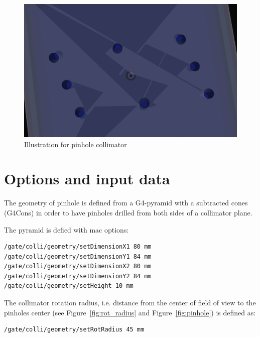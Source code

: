 \documentclass[12pt]{article}
\begin{document}
\begin{figure}[htp]
\centering
\includegraphics[scale=0.3]{figs/colli.png}
\caption{Illustration for pinhole collimator}
\label{fig:colli}
\end{figure}


\section{Options and input data}
The geometry of pinhole is defined from a G4-pyramid with a subtracted cones (G4Cons) in order to have pinholes drilled from both sides of a collimator plane.

The pyramid is defied with mac options:  
\begin{verbatim}
/gate/colli/geometry/setDimensionX1 80 mm
/gate/colli/geometry/setDimensionY1 84 mm
/gate/colli/geometry/setDimensionX2 80 mm
/gate/colli/geometry/setDimensionY2 84 mm
/gate/colli/geometry/setHeight 10 mm
\end{verbatim}

The collimator rotation radius, i.e. distance from the center of field of view to the pinholes center (see Figure~\ref{fig:rot_radius} and Figure~\ref{fig:pinhole}) is defined as:
\begin{verbatim}
/gate/colli/geometry/setRotRadius 45 mm
\end{verbatim}
\end{document}
